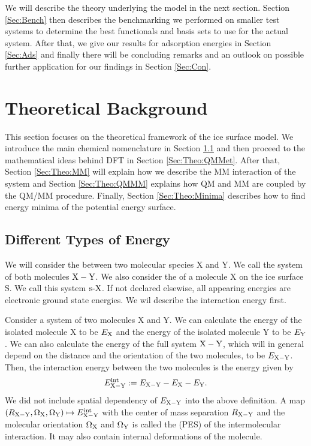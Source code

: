 \documentclass[8.5pt,twoside,twocolumn]{article}
\newcommand\eint{\enmat{E^{\te{int}}}}
\newcommand\sur{\enmat{\te{s-}}}
\theoremstyle{standard}
\begin{document}
We will describe the theory underlying the model in the next section. Section \ref{Sec:Bench} then describes the
benchmarking we performed on smaller test systems to determine the best functionals and basis sets to use for 
the actual system. After that, we give our results for adsorption energies in Section \ref{Sec:Ads} and finally 
there will be concluding remarks and an outlook on possible further application for our findings in Section 
\ref{Sec:Con}.

\section{Theoretical Background}
\label{Sec:Theo}
This section focuses on the theoretical framework of the ice surface model. We introduce the main chemical
nomenclature in Section \ref{Sec:Theo:Interaction} and then proceed to the mathematical ideas behind
DFT in Section \ref{Sec:Theo:QMMet}. After that, Section \ref{Sec:Theo:MM} will explain how we describe
the MM interaction of the system and Section \ref{Sec:Theo:QMMM} explains how QM and MM are coupled
by the QM/MM procedure. Finally, Section \ref{Sec:Theo:Minima} describes how to find energy minima
of the potential energy surface.

\newcommand\X{\enmat{\te X}}
\newcommand\Y{\enmat{\te Y}}
\newcommand\XY{{\enmat{\X - \Y}}}
\renewcommand\S{\enmat{\te S}}
\newcommand\sX{\enmat{\sur\te{X}}}
\newcommand\A{\enmat{\te A}}
\subsection{Different Types of Energy}
\label{Sec:Theo:Interaction}
We will consider the  between two molecular species X and Y. We call
the system of both molecules $\XY$. We also consider the  of a molecule X on
the ice surface S. We call this system $\sX$. If not declared elsewise, all appearing energies are
electronic ground state energies. We wil describe the interaction energy first.

Consider a system of two molecules X and Y. We can calculate the energy of the isolated molecule X to
be $E_{\text X}$ and the energy of the isolated molecule Y to be $E_{\text Y}$. We can also calculate the 
energy of the full system $\XY$, which will in general depend on the distance and the orientation
of the two molecules, to be $E_{\XY}$. Then, the interaction energy between the two molecules
is the energy given by
\begin{equation}
 \eint_{\XY} := E_{\XY} - E_\X - E_\Y.
 \label{Theo:InteractionEnergy}
\end{equation}
We did not include spatial dependency of $E_{\XY}$ into the above definition. A map
\mbox{$(R_\XY, \Om_\X, \Om_\Y) \mapsto \eint_\XY$} with the center of mass separation
$R_\XY$ and the molecular orientation $\Om_\X$ and $\Om_\Y$ is called the  (PES)
of the intermolecular interaction. It may also contain internal deformations of the molecule.
\end{document}
